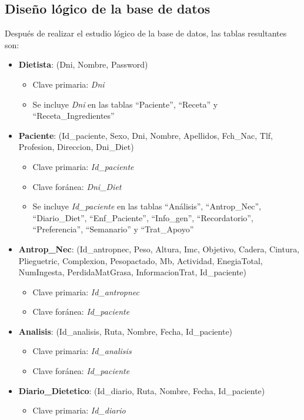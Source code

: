 \subsection{Diseño lógico de la base de datos}
Después de realizar el estudio lógico de la base de datos, las tablas resultantes son:
\begin{itemize}
\item \textbf{Dietista}: (Dni, Nombre, Password)
\begin{itemize}
\item Clave primaria: \textit{Dni}
\item Se incluye \textit{Dni} en las tablas ``Paciente'', ``Receta'' y ``Receta\_Ingredientes''
\end{itemize}
\item \textbf{Paciente}: (Id\_paciente, Sexo, Dni, Nombre, Apellidos, Fch\_Nac, Tlf, Profesion, Direccion, Dni\_Diet)
\begin{itemize}
\item Clave primaria: \textit{Id\_paciente}
\item Clave foránea: \textit{Dni\_Diet}
\item Se incluye \textit{Id\_paciente} en las tablas ``Análisis'', ``Antrop\_Nec'', ``Diario\_Diet'', ``Enf\_Paciente'', ``Info\_gen'', ``Recordatorio'', ``Preferencia'', ``Semanario'' y ``Trat\_Apoyo''
\end{itemize}
\item \textbf{Antrop\_Nec}: (Id\_antropnec, Peso, Altura, Imc, Objetivo, Cadera, Cintura, Plieguetric, Complexion, Pesopactado, Mb, Actividad, EnegiaTotal, NumIngesta, PerdidaMatGrasa, InformacionTrat, Id\_paciente)
\begin{itemize}
\item Clave primaria: \textit{Id\_antropnec}
\item Clave foránea: \textit{Id\_paciente}
\end{itemize}
\item \textbf{Analisis}: (Id\_analisis, Ruta, Nombre, Fecha, Id\_paciente)
\begin{itemize}
\item Clave primaria: \textit{Id\_analisis}
\item Clave foránea: \textit{Id\_paciente}
\end{itemize}
\item \textbf{Diario\_Dietetico}: (Id\_diario, Ruta, Nombre, Fecha, Id\_paciente)
\begin{itemize}
\item Clave primaria: \textit{Id\_diario}

\end{itemize}
\end{itemize}

